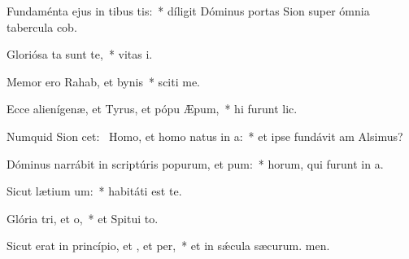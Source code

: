 \item Fundaménta ejus in tibus tis:~* díligit Dóminus portas Sion super ómnia tabercula cob.
\item Gloriósa ta sunt  te,~* vitas i.
\item Memor ero Rahab, et bynis~* sciti me.
\item Ecce alienígenæ, et Tyrus, et pópu Æpum,~* hi furunt lic.
\item Numquid Sion cet:~\pscross{} Homo, et homo natus  in a:~* et ipse fundávit am Alsimus?
\item Dóminus narrábit in scriptúris popurum, et pum:~* horum, qui furunt in a.
\item Sicut lætium um:~* habitáti est  te.
\item Glória tri, et o,~* et Spitui to.
\item Sicut erat in princípio, et , et per,~* et in sǽcula sæcurum. men.
